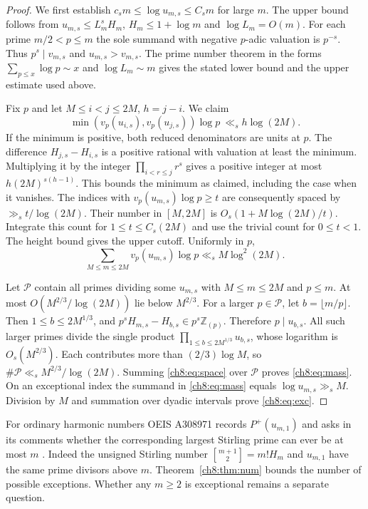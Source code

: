 \documentclass[11pt,a4paper,oneside,openany]{report}
\theoremstyle{remark}\newtheorem{remark}[theorem]{Remark}
\numberwithin{equation}{section}
\newcommand{\Z}{\mathbb Z}\newcommand{\N}{\mathbb N}
\newcommand{\card}{\#}\newcommand{\vol}{\operatorname{meas}}
\begin{document}
\begin{proof}
We first establish $c_s m\le\log u_{m,s}\le C_s m$ for large $m$. The upper bound follows from $u_{m,s}\le L_m^s H_m$, $H_m\le1+\log m$ and $\log L_m=O(m)$. For each prime $m/2<p\le m$ the sole summand with negative $p$-adic valuation is $p^{-s}$. Thus $p^s\mid v_{m,s}$ and $u_{m,s}>v_{m,s}$. The prime number theorem in the forms $\sum_{p\le x}\log p\sim x$ and $\log L_m\sim m$ gives the stated lower bound and the upper estimate used above.

Fix $p$ and let $M\le i<j\le2M$, $h=j-i$. We claim
\[
 \min(v_p(u_{i,s}),v_p(u_{j,s}))\log p\ \ll_s h\log(2M).
\]
If the minimum is positive, both reduced denominators are units at $p$. The difference $H_{j,s}-H_{i,s}$ is a positive rational with valuation at least the minimum. Multiplying it by the integer $\prod_{i<r\le j}r^s$ gives a positive integer at most $h(2M)^{s(h-1)}$. This bounds the minimum as claimed, including the case when it vanishes. The indices with $v_p(u_{m,s})\log p\ge t$ are consequently spaced by $\gg_s t/\log(2M)$. Their number in $[M,2M]$ is $O_s(1+M\log(2M)/t)$. Integrate this count for $1\le t\le C_s(2M)$ and use the trivial count for $0\le t<1$. The height bound gives the upper cutoff. Uniformly in $p$,
\begin{equation}
 \sum_{M\le m\le2M}v_p(u_{m,s})\log p\ll_s M\log^2(2M).\label{ch8:eq:space}
\end{equation}

Let $\mathcal P$ contain all primes dividing some $u_{m,s}$ with $M\le m\le2M$ and $p\le m$. At most $O(M^{2/3}/\log(2M))$ lie below $M^{2/3}$. For a larger $p\in\mathcal P$, let $b=\lfloor m/p\rfloor$. Then $1\le b\le2M^{1/3}$, and
$p^s H_{m,s}-H_{b,s}\in p^s\Z_{(p)}$. Therefore $p\mid u_{b,s}$. All such larger primes divide the single product $\prod_{1\le b\le2M^{1/3}}u_{b,s}$, whose logarithm is $O_s(M^{2/3})$. Each contributes more than $(2/3)\log M$, so $\card\mathcal P\ll_s M^{2/3}/\log(2M)$. Summing \eqref{ch8:eq:space} over $\mathcal P$ proves \eqref{ch8:eq:mass}. On an exceptional index the summand in \eqref{ch8:eq:mass} equals $\log u_{m,s}\gg_s M$. Division by $M$ and summation over dyadic intervals prove \eqref{ch8:eq:exc}.
\end{proof}
For ordinary harmonic numbers OEIS A308971 records $P^+(u_{m,1})$ and asks in its comments whether the corresponding largest Stirling prime can ever be at most $m$ \cite{oeis-harmonic}. Indeed the unsigned Stirling number $\genfrac{[}{]}{0pt}{}{m+1}{2}=m!H_m$ and $u_{m,1}$ have the same prime divisors above $m$. Theorem~\ref{ch8:thm:num} bounds the number of possible exceptions. Whether any $m\ge2$ is exceptional remains a separate question.
\end{document}
